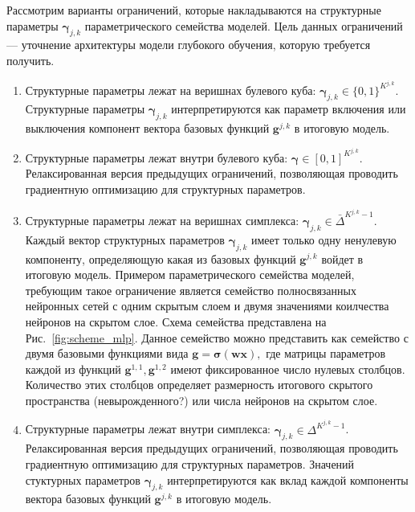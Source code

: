 Рассмотрим варианты ограничений, которые накладываются на структурные параметры $\boldsymbol{\gamma}_{j,k}$ параметрического семейства моделей. Цель данных ограничений --- уточнение архитектуры модели глубокого обучения, которую требуется получить. 
\begin{enumerate}
\item Структурные параметры лежат на веришнах булевого куба: $\boldsymbol{\gamma}_{j,k} \in \{0,1\}^{K^{j,k}}$. Структурные параметры  $\boldsymbol{\gamma}_{j,k}$ интерпретируются как параметр включения или выключения компонент вектора базовых функций $\mathbf{g}^{j,k}$ в итоговую модель.
\item Структурные параметры лежат внутри булевого куба: $\boldsymbol{\gamma} \in [0,1]^{K^{j,k}}$. Релаксированная версия предыдущих ограничений, позволяющая проводить градиентную оптимизацию для структурных параметров.
\item Структурные параметры лежат на веришнах симплекса: $\boldsymbol{\gamma}_{j,k} \in \bar{\Delta}^{K^{j,k}-1}$. Каждый вектор структурных параметров $\boldsymbol{\gamma}_{j,k}$ имеет только одну ненулевую компоненту, определяющую какая из базовых функций $\mathbf{g}^{j,k}$ войдет в итоговую модель. Примером параметрического семейства моделей, требующим такое ограничение является семейство полносвязанных нейронных сетей с одним скрытым слоем и двумя значениями коилчества нейронов на скрытом слое. Схема семейства представлена на Рис.~\ref{fig:scheme_mlp}. Данное семейство можно представить как семейство с двумя базовыми функциями вида $\mathbf{g} = \boldsymbol{\sigma}(\mathbf{w}\mathbf{x}),$ где матрицы параметров каждой из функций  $\mathbf{g}^{1,1}, \mathbf{g}^{1,2}$ имеют фиксированное число нулевых столбцов. Количество этих столбцов определяет размерность итогового скрытого пространства (невырожденного?) или числа нейронов на скрытом слое.
\item  Структурные параметры лежат внутри симплекса: $\boldsymbol{\gamma}_{j,k} \in {\Delta}^{K^{j,k}-1}$. Релаксированная версия предыдущих ограничений, позволяющая проводить градиентную оптимизацию для структурных параметров. Значений стуктурных параметров $\boldsymbol{\gamma}_{j,k}$ интерпретируются как вклад каждой компоненты вектора базовых функций $\mathbf{g}^{j,k}$ в итоговую модель. 
\end{enumerate}

